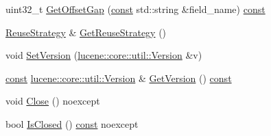 \begin{DoxyCompactItemize}
\item 
uint32\+\_\+t \mbox{\hyperlink{classlucene_1_1core_1_1analysis_1_1Analyzer_af535ad197952fbf88c74e4298bb6a9f1}{Get\+Offset\+Gap}} (\mbox{\hyperlink{ZlibCrc32_8h_a2c212835823e3c54a8ab6d95c652660e}{const}} std\+::string \&field\+\_\+name) \mbox{\hyperlink{ZlibCrc32_8h_a2c212835823e3c54a8ab6d95c652660e}{const}}
\item 
\mbox{\hyperlink{classlucene_1_1core_1_1analysis_1_1Analyzer_1_1ReuseStrategy}{Reuse\+Strategy}} \& \mbox{\hyperlink{classlucene_1_1core_1_1analysis_1_1Analyzer_afbf37ccc45ae5a78ef6f9399ac484c64}{Get\+Reuse\+Strategy}} ()
\item 
void \mbox{\hyperlink{classlucene_1_1core_1_1analysis_1_1Analyzer_a01e5c8ed08d7e4e0dc73146e4e473134}{Set\+Version}} (\mbox{\hyperlink{classlucene_1_1core_1_1util_1_1Version}{lucene\+::core\+::util\+::\+Version}} \&v)
\item 
\mbox{\hyperlink{ZlibCrc32_8h_a2c212835823e3c54a8ab6d95c652660e}{const}} \mbox{\hyperlink{classlucene_1_1core_1_1util_1_1Version}{lucene\+::core\+::util\+::\+Version}} \& \mbox{\hyperlink{classlucene_1_1core_1_1analysis_1_1Analyzer_a7a0f792d9e31a54ffa8c1d53f087fac8}{Get\+Version}} () \mbox{\hyperlink{ZlibCrc32_8h_a2c212835823e3c54a8ab6d95c652660e}{const}}
\item 
void \mbox{\hyperlink{classlucene_1_1core_1_1analysis_1_1Analyzer_a5c80fc8a7e06ebd552d9d4e42d7466ad}{Close}} () noexcept
\item 
bool \mbox{\hyperlink{classlucene_1_1core_1_1analysis_1_1Analyzer_a3a533567be4805332be57160b0364b79}{Is\+Closed}} () \mbox{\hyperlink{ZlibCrc32_8h_a2c212835823e3c54a8ab6d95c652660e}{const}} noexcept
\end{DoxyCompactItemize}
